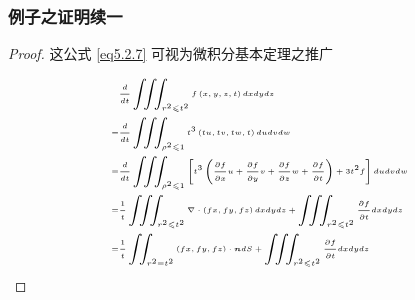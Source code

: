 \documentclass[aspectratio=2516]{beamer}
\begin{document}
\begin{frame}
\frametitle{\kaishu 例子之证明续一}

\kaishu

\begin{proof}
	
	\kaishu
	
	\small 
	
	这公式 \ref{eq5.2.7} 可视为微积分基本定理之推广
	
	\begin{equation}
	\tiny 
	\begin{split}
	& \frac{d}{{dt}}\iiint_{{r^2} \leqslant {t^2}} {f\left( {x,y,z,t} \right)dxdydz}\\
	=   & \frac{d}{{dt}}\iiint_{{\rho ^2} \leqslant 1} {{t^3}\left( {tu,tv,tw,t} \right)dudvdw} \\
	=   & \frac{d}{{dt}}\iiint_{{\rho ^2} \leqslant 1} {\left[ {{t^3}\left( {\frac{{\partial f}}{{\partial x}}u + \frac{{\partial f}}{{\partial y}}v + \frac{{\partial f}}{{\partial z}}w + \frac{{\partial f}}{{\partial t}}} \right) + 3{t^2}f} \right]dudvdw} \\
	=   & \frac{1}{t}\iiint_{{r^2} \leqslant {t^2}} {\nabla  \cdot \left( {fx,fy,fz} \right)dxdydz} + \iiint_{{r^2} \leqslant {t^2}} {\frac{{\partial f}}{{\partial t}}dxdydz}\\
	=   & \frac{1}{t}\iint_{{r^2} = {t^2}} {\left( {fx,fy,fz} \right) \cdot \boldsymbol{n}dS} + \iiint_{{r^2} \leqslant {t^2}} {\frac{{\partial f}}{{\partial t}}dxdydz}
	\end{split}
	\notag 
	\end{equation}
	
\end{proof}

\end{frame}

\end{document}
